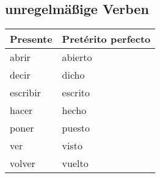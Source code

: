 \documentclass{../spanish_summary}
\begin{document}
      \subsection*{unregelmäßige Verben}
        \begin{longtable}{p{} | p{}} 
          Presente & Pretérito perfecto \\ \hline
          \hline
          abrir & abierto \\
          decir & dicho \\
          escribir & escrito \\
          hacer & hecho \\
          poner & puesto \\
          ver & visto \\
          volver & vuelto
        \end{longtable}
      
  \newpage
\end{document}
